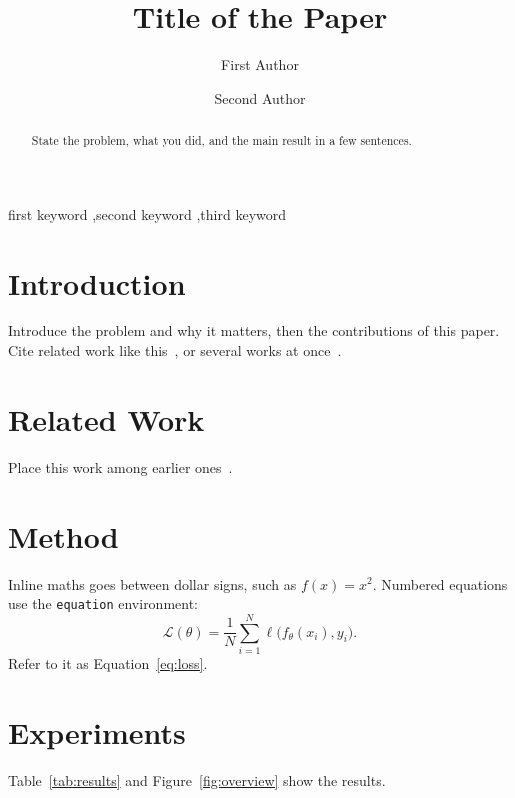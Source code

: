 \documentclass[preprint,12pt]{elsarticle}
\begin{document}
\begin{frontmatter}

\title{Title of the Paper}

\author[inst1]{First Author}
\author[inst2]{Second Author}


\begin{abstract}
State the problem, what you did, and the main result in a few sentences.
\end{abstract}

\begin{keyword}
first keyword \sep second keyword \sep third keyword
\end{keyword}

\end{frontmatter}

\section{Introduction}
\label{sec:intro}
Introduce the problem and why it matters, then the contributions of this
paper. Cite related work like this~\cite{he2016deep}, or several works at
once~\cite{vaswani2017attention,he2016deep}.

\section{Related Work}
Place this work among earlier ones~\cite{knuth1984,lamport1994}.

\section{Method}
\label{sec:method}
Inline maths goes between dollar signs, such as $f(x) = x^2$. Numbered
equations use the \texttt{equation} environment:
\begin{equation}
  \label{eq:loss}
  \mathcal{L}(\theta) = \frac{1}{N} \sum_{i=1}^{N} \ell\bigl(f_\theta(x_i), y_i\bigr).
\end{equation}
Refer to it as Equation~\eqref{eq:loss}.

\section{Experiments}
\label{sec:experiments}
Table~\ref{tab:results} and Figure~\ref{fig:overview} show the results.
\end{document}
